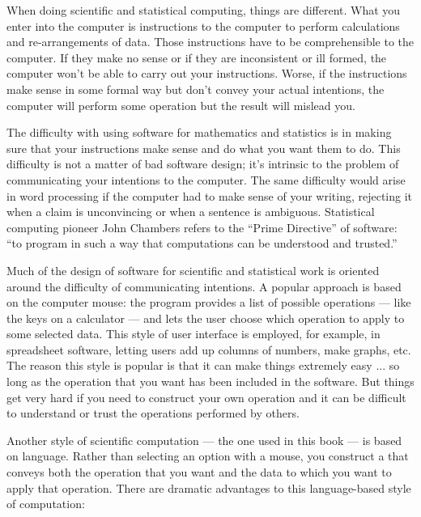 When doing scientific and statistical computing, things are different.
What you enter into the computer is instructions to the computer to
perform calculations and re-arrangements of data.  Those instructions
have to be comprehensible to the computer.  If they make no sense or
if they are inconsistent or ill formed, the computer won't be able to
carry out your instructions.  Worse, if the instructions make sense in
some formal way but don't convey your actual intentions, the computer
will perform some operation but the result will mislead you.

The difficulty with using software for mathematics and statistics is
in making sure that your instructions make sense and do what you want
them to do.  This difficulty is not a matter of bad software design;
it's intrinsic to the problem of communicating your intentions to the
computer.  The same difficulty would arise in word processing if the
computer had to make sense of your writing, rejecting it when a claim
is unconvincing or when a sentence is ambiguous. Statistical computing
pioneer John Chambers 
 refers to the ``Prime Directive'' of
software\cite{chambers-2008}: ``to program in such a way that
computations can be understood and trusted.''

Much of the design of software for scientific and statistical work is
oriented around the difficulty of communicating intentions.  A popular
approach is based on the computer mouse: the program provides a list
of possible operations --- like the keys on a calculator --- and lets
the user choose which operation to apply to some selected data.  This
style of user interface is employed, for example, in spreadsheet
software, letting users add up columns of numbers, make graphs, etc.
The reason this style is popular is that it can make things extremely
easy ... so long as the operation that you want has been included in
the software.  But things get very hard if you need to construct your
own operation and it can be difficult to understand or trust the
operations performed by others.

Another style of scientific computation --- the one used in this
book --- is based on language.  Rather than selecting an option with a
mouse, you construct a  that conveys both the
operation that you want and the data to which you want to apply that
operation.  There are dramatic advantages to this language-based
style of computation:

